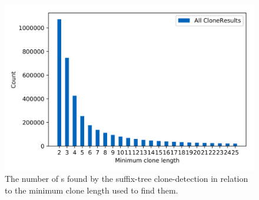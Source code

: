 
\begin{figure}
	\centering
	\includegraphics[width=0.8\linewidth]{figures/Thresholds/raw.png}
	\caption[All found CloneResults in relation to the minimum clone length]{The number of s found by the suffix-tree clone-detection in relation to the minimum clone length used to find them.}
	\label{fig:thresholdsAll}
\end{figure}
